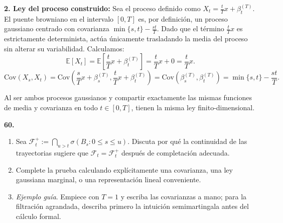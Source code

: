 \documentclass[11pt, letterpaper]{article}
\begin{document}
\begin{solucion}
    \textbf{2. Ley del proceso construido:}
    Sea el proceso definido como $X_t = \frac{t}{T}x + \beta_t^{(T)}$.
    El puente browniano en el intervalo $[0, T]$ es, por definición, un proceso gaussiano centrado con covarianza $\min\{s, t\} - \frac{st}{T}$.
    Dado que el término $\frac{t}{T}x$ es estrictamente determinista, actúa únicamente trasladando la media del proceso sin alterar su variabilidad. Calculamos:
    \[ \mathbb{E}[X_t] = \mathbb{E}\left[ \frac{t}{T}x + \beta_t^{(T)} \right] = \frac{t}{T}x + 0 = \frac{t}{T}x. \]
    \[ \text{Cov}(X_s, X_t) = \text{Cov}\left(\frac{s}{T}x + \beta_s^{(T)}, \frac{t}{T}x + \beta_t^{(T)}\right) = \text{Cov}(\beta_s^{(T)}, \beta_t^{(T)}) = \min\{s, t\} - \frac{st}{T}. \]
    
    Al ser ambos procesos gaussianos y compartir exactamente las mismas funciones de media y covarianza en todo $t \in [0,T]$, tienen la misma ley finito-dimensional.
\end{solucion}

\newpage

\begin{ejercicio}
    \textbf{60.} 
    \begin{enumerate}
        \item Sea $\mathcal{F}_{t}^{+}:=\bigcap_{u>t}\sigma(B_{s}:0\le s\le u)$. Discuta por qué la continuidad de las trayectorias sugiere que $\mathcal{F}_{t}=\mathcal{F}_{t}^{+}$ después de completación adecuada.
        \item Complete la prueba calculando explícitamente una covarianza, una ley gaussiana marginal, o una representación lineal conveniente.
        \item \textit{Ejemplo guía}. Empiece con $T=1$ y escriba las covarianzas a mano; para la filtración agrandada, describa primero la intuición semimartingala antes del cálculo formal.
    \end{enumerate}
\end{ejercicio}

\vspace{5mm}
\end{document}
